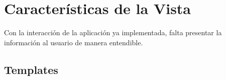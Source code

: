 %
%
%
%
%

\section{Características de la Vista}

Con la interacción de la aplicación ya implementada, falta presentar la información al usuario de manera entendible.

\label{sec-view}
\subsection{Templates}
\label{sub-templates}

